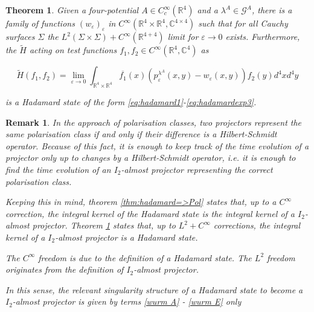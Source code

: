 \documentclass[b5paper,draft,openbib,12pt]{memoir}
\newtheorem{Thm}[Def]{Theorem}
\newtheorem{Remark}[Def]{Remark}
\begin{document}
\begin{Thm}\label{thm:Pol=>hadamard}
Given a four-potential \(A\in C_c^\infty (\mathbb{R}^4)\) and a \(\lambda^A\in\mathcal{G}^A\), there is a family of functions
\((w_\varepsilon)_\varepsilon\) in \( C^\infty(\mathbb{R}^4 \times \mathbb{R}^4 ,\mathbb{C}^{4\times 4})\) such that for all Cauchy surfaces \(\Sigma\)
the \(L^2(\Sigma\times\Sigma)+C^\infty(\mathbb{R}^{4+4})\) %
limit for \(\varepsilon \rightarrow0\) exists. 
Furthermore, the \(\tilde{H}\) acting on test functions \(f_1,f_2\in C^\infty(\mathbb{R}^{4}, \mathbb{C}^4)\) as

\begin{equation}
\tilde{H}(f_1,f_2)=\lim_{\varepsilon \rightarrow 0} \int_{\mathbb{R}^{4}\times\mathbb{R}^4} \overline{f_1}(x)
\left(p_\varepsilon^{\lambda^A}(x,y)-w_\varepsilon(x,y)\right)f_2(y) d^4x d^4y
\end{equation}

is a Hadamard state of the form \eqref{eq:hadamard1}-\eqref{eq:hadamardexp3}.
\end{Thm}

\begin{Remark}
In the approach of polarisation classes, two projectors represent the same polarisation class if and only if their difference is a Hilbert-Schmidt operator. 
Because of this fact, it is enough to keep track of the time evolution of a projector only up to changes by a Hilbert-Schmidt operator, i.e. it is enough
to find the time evolution of an \(I_2\)-almost projector representing the correct polarisation class. 

Keeping this in mind,
theorem \ref{thm:hadamard=>Pol} states that, up to a \(C^\infty\) correction, the integral kernel of the Hadamard state is the integral kernel of a \(I_2\)-almost projector.
Theorem \ref{thm:Pol=>hadamard} states that, up to \(L^2+C^\infty\) corrections, the integral kernel of a \(I_2\)-almost projector is a Hadamard state.

The \(C^\infty\) freedom is due to the definition of a Hadamard state. The \(L^2\) freedom originates from the definition of \(I_2\)-almost projector.

In this sense, the relevant singularity structure of a Hadamard state to become a \(I_2\)-almost projector is given by terms \eqref{wurm A} - \eqref{wurm E} only
\end{Remark}

\end{document}
